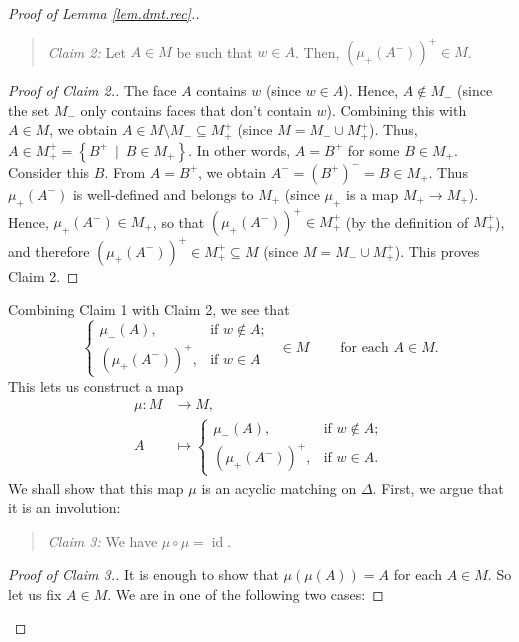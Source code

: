 \documentclass[12pt]{amsart}
\theoremstyle{definition}
\newenvironment{statement}{\begin{quote}}{\end{quote}}
\begin{document}
\begin{proof}[Proof of Lemma \ref{lem.dmt.rec}.]
\begin{statement}
\textit{Claim 2:} Let $A\in M$ be such that $w\in A$. Then, $\left(  \mu
_+\left(  A^-\right)  \right)  ^+\in M$.
\end{statement}

\begin{proof}
[Proof of Claim 2.]The face $A$ contains $w$ (since $w\in A$). Hence, $A\notin
M_-$ (since the set $M_-$ only contains faces that don't contain $w$).
Combining this with $A\in M$, we obtain $A\in M\setminus M_-\subseteq
M_+^+$ (since $M=M_-\cup M_+^+$). Thus, $A\in M_+^+=\left\{
B^+\ \mid\ B\in M_+\right\}  $. In other words, $A=B^+$ for some $B\in
M_+$. Consider this $B$. From $A=B^+$, we obtain $A^-=\left(
B^+\right)  ^-=B\in M_+$. Thus $\mu_+\left(  A^-\right)  $ is
well-defined and belongs to $M_+$ (since $\mu_+$ is a map $M_+%
\rightarrow M_+$). Hence, $\mu_+\left(  A^-\right)  \in M_+$, so that
$\left(  \mu_+\left(  A^-\right)  \right)  ^+\in M_+^+$ (by the
definition of $M_+^+$), and therefore $\left(  \mu_+\left(
A^-\right)  \right)  ^+\in M_+^+\subseteq M$ (since $M=M_-\cup
M_+^+$). This proves Claim 2.
\end{proof}

Combining Claim 1 with Claim 2, we see that
\[%
\begin{cases}
\mu_-\left(  A\right)  , & \text{if }w\notin A;\\
\left(  \mu_+\left(  A^-\right)  \right)  ^+, & \text{if }w\in A
\end{cases}
\ \ \in M\ \ \ \ \ \ \ \ \ \ \text{for each }A\in M.
\]
This lets us construct a map%
\begin{align*}
\mu:M  &  \rightarrow M,\\
A  &  \mapsto%
\begin{cases}
\mu_-\left(  A\right)  , & \text{if }w\notin A;\\
\left(  \mu_+\left(  A^-\right)  \right)  ^+, & \text{if }w\in A.
\end{cases}
\end{align*}
We shall show that this map $\mu$ is an acyclic matching on $\Delta$. First,
we argue that it is an involution:

\begin{statement}
\textit{Claim 3:} We have $\mu\circ\mu=\operatorname*{id}$.
\end{statement}

\begin{proof}
[Proof of Claim 3.]It is enough to show that $\mu\left(  \mu\left(  A\right)
\right)  =A$ for each $A\in M$. So let us fix $A\in M$. We are in one of the
following two cases:


\end{proof}
\end{proof}
\end{document}
